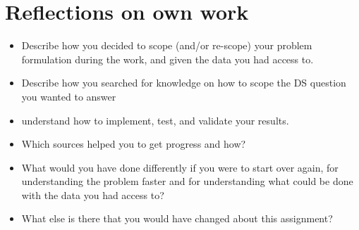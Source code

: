 \section{Reflections on own work}
\label{chap:reflection}
\begin{itemize}
    \item Describe how you decided to scope (and/or re-scope) your problem formulation during the work, and given the data you had access to.
    \item Describe how you searched for knowledge on how to scope the DS question you wanted to answer 
    \item understand how to implement, test, and validate your results. 
    \item Which sources helped you to get progress and how?
    \item What would you have done differently if you were to start over again, for understanding the problem faster and for understanding what could be done with the data you had access to?
    \item What else is there that you would have changed about this assignment?
\end{itemize}

\newpage